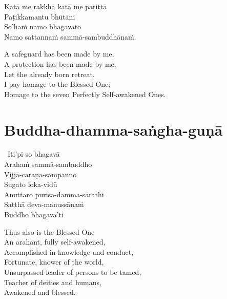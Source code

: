 \begin{pali-hang-continued}
  Katā me rakkhā katā me parittā\\
  Paṭikkamantu bhūtāni\\
  So'haṁ namo bhagavato\\
  Namo sattannaṁ sammā-sambuddhānaṁ.
\end{pali-hang-continued}

\begin{english-verses}
  A safeguard has been made by me,\\
  A protection has been made by me.\\
  Let the already born retreat.\\
  I pay homage to the Blessed One;\\
  Homage to the seven Perfectly Self-awakened Ones.
\end{english-verses}

\suttaRef{[AN 4.67]}

\section{Buddha-dhamma-saṅgha-guṇā}
\label{buddha-dhamma-sangha-guna}

\begin{pali-hang}
  \anglebracketleft\ \hspace{-0.5mm}Iti'pi so bhagavā \hspace{-0.5mm}\anglebracketright\ \\
  Arahaṁ sammā-sambuddho\\
  Vijjā-caraṇa-sampanno\\
  Sugato loka-vidū\\
  Anuttaro purisa-damma-sārathi\\
  Satthā deva-manussānaṁ\\
  Buddho bhagavā'ti
\end{pali-hang}

\begin{english-verses}
  Thus also is the Blessed One\\
  An arahant, fully self-awakened,\\
  Accomplished in knowledge and conduct,\\
  Fortunate, knower of the world,\\
  Unsurpassed leader of persons to be tamed,\\
  Teacher of deities and humans,\\
  Awakened and blessed.
\end{english-verses}

